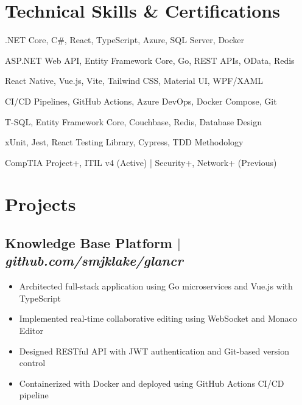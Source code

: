 \documentclass[11pt]{article} %
\begin{document}
\section{Technical Skills \& Certifications}

\begin{description}[itemsep=0pt]
	\item[Core Stack] .NET Core, C\#, React, TypeScript, Azure, SQL Server, Docker
	\item[Backend] ASP.NET Web API, Entity Framework Core, Go, REST APIs, OData, Redis
	\item[Frontend] React Native, Vue.js, Vite, Tailwind CSS, Material UI, WPF/XAML
	\item[DevOps] CI/CD Pipelines, GitHub Actions, Azure DevOps, Docker Compose, Git
	\item[Database] T-SQL, Entity Framework Core, Couchbase, Redis, Database Design
	\item[Testing] xUnit, Jest, React Testing Library, Cypress, TDD Methodology
	\item[Certifications] CompTIA Project+, ITIL v4 (Active) | Security+, Network+ (Previous)
\end{description}

\section{Projects}
\subsection{Knowledge Base Platform $|$ \normalfont\textit{github.com/smjklake/glancr}}
\begin{itemize}
  \item Architected full-stack application using Go microservices and Vue.js with TypeScript
  \item Implemented real-time collaborative editing using WebSocket and Monaco Editor
  \item Designed RESTful API with JWT authentication and Git-based version control
  \item Containerized with Docker and deployed using GitHub Actions CI/CD pipeline
\end{itemize}
\end{document}
